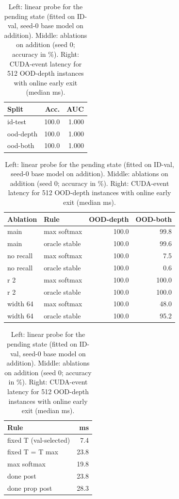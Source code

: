 \begin{table}[h]
\centering
\caption{Left: linear probe for the pending state (fitted on ID-val, seed-0 base model on addition). Middle: ablations on addition (seed 0; accuracy in \%). Right: CUDA-event latency for 512 OOD-depth instances with online early exit (median ms).}
\label{tab:probes}
\small
\begin{tabular}{lrr}
\toprule
Split & Acc. & AUC \\
\midrule
id-test & 100.0 & 1.000 \\
ood-depth & 100.0 & 1.000 \\
ood-both & 100.0 & 1.000 \\
\bottomrule
\end{tabular}\quad
\begin{tabular}{llrr}
\toprule
Ablation & Rule & OOD-depth & OOD-both \\
\midrule
main & max softmax & 100.0 & 99.8 \\
main & oracle stable & 100.0 & 99.6 \\
no recall & max softmax & 100.0 & 7.5 \\
no recall & oracle stable & 100.0 & 0.6 \\
r 2 & max softmax & 100.0 & 100.0 \\
r 2 & oracle stable & 100.0 & 100.0 \\
width 64 & max softmax & 100.0 & 48.0 \\
width 64 & oracle stable & 100.0 & 95.2 \\
\bottomrule
\end{tabular}\quad
\begin{tabular}{lr}
\toprule
Rule & ms \\
\midrule
fixed T (val-selected) & 7.4 \\
fixed T = T max & 23.8 \\
max softmax & 19.8 \\
done post & 23.8 \\
done prop post & 28.3 \\
\bottomrule
\end{tabular}
\end{table}

